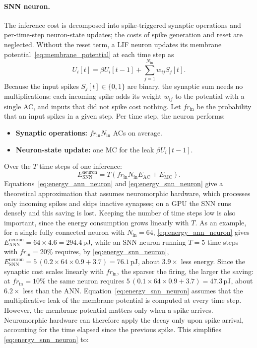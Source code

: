 \paragraph{SNN neuron.} The inference cost is decomposed into spike-triggered synaptic operations and per-time-step neuron-state updates; the costs of spike generation and reset are neglected. Without the reset term, a LIF neuron updates its membrane potential~\eqref{eq:membrane_potential} at each time step as
\begin{equation}
    U_i[t] = \beta U_i[t-1] + \sum_{j=1}^{N_{\mathrm{in}}} w_{ij} S_j[t] .
\end{equation}
Because the input spikes $S_j[t] \in \{0,1\}$ are binary, the synaptic sum needs no multiplications: each incoming spike adds its weight $w_{ij}$ to the potential with a single AC, and inputs that did not spike cost nothing. Let $fr_{\mathrm{in}}$ be the probability that an input spikes in a given step. Per time step, the neuron performs:
\begin{itemize}
    \item \textbf{Synaptic operations:} $fr_{\mathrm{in}} N_{\mathrm{in}}$ ACs on average.
    \item \textbf{Neuron-state update:} one MC for the leak $\beta U_i[t-1]$.
\end{itemize}
Over the $T$ time steps of one inference:
\begin{equation}
    E_{\mathrm{SNN}}^{\mathrm{neuron}} = T \left( fr_{\mathrm{in}} N_{\mathrm{in}} E_{\mathrm{AC}} + E_{\mathrm{MC}} \right).
    \label{eq:energy_snn_neuron}
\end{equation}
Equations~\eqref{eq:energy_ann_neuron} and \eqref{eq:energy_snn_neuron} give a theoretical approximation that assumes neuromorphic hardware, which processes only incoming spikes and skips inactive synapses; on a GPU the SNN runs densely and this saving is lost. Keeping the number of time steps low is also important, since the energy consumption grows linearly with $T$. As an example, for a single fully connected neuron with $N_{\mathrm{in}}=64$, \eqref{eq:energy_ann_neuron} gives $E_{\mathrm{ANN}}^{\mathrm{neuron}} = 64 \times 4.6 = 294.4$\,pJ, while an SNN neuron running $T=5$ time steps with $fr_{\mathrm{in}}=20\%$ requires, by \eqref{eq:energy_snn_neuron}, $E_{\mathrm{SNN}}^{\mathrm{neuron}} = 5\,(0.2 \times 64 \times 0.9 + 3.7) = 76.1$\,pJ, about $3.9\times$ less energy. Since the synaptic cost scales linearly with $fr_{\mathrm{in}}$, the sparser the firing, the larger the saving: at $fr_{\mathrm{in}}=10\%$ the same neuron requires $5\,(0.1 \times 64 \times 0.9 + 3.7) = 47.3$\,pJ, about $6.2\times$ less than the ANN. Equation~\eqref{eq:energy_snn_neuron} assumes that the multiplicative leak of the membrane potential is computed at every time step. However, the membrane potential matters only when a spike arrives. Neuromorphic hardware can therefore apply the decay only upon spike arrival, accounting for the time elapsed since the previous spike. This simplifies \eqref{eq:energy_snn_neuron} to:
